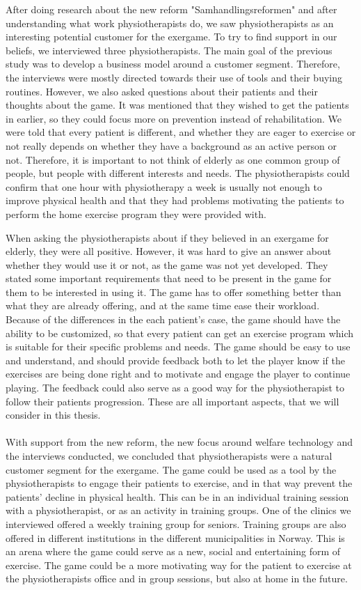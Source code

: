 After doing research about the new reform "Samhandlingsreformen" and after understanding what work physiotherapists do, we saw physiotherapists as an interesting potential customer for the exergame. To try to find support in our beliefs, we interviewed three physiotherapists. The main goal of the previous study was to develop a business model around a customer segment. Therefore, the interviews were mostly directed towards their use of tools and their buying routines. However, we also asked questions about their patients and their thoughts about the game. It was mentioned that they wished to get the patients in earlier, so they could focus more on prevention instead of rehabilitation. We were told that every patient is different, and whether they are eager to exercise or not really depends on whether they have a background as an active person or not. Therefore, it is important to not think of elderly as one common group of people, but people with different interests and needs. The physiotherapists could confirm that one hour with physiotherapy a week is usually not enough to improve physical health and that they had problems motivating the patients to perform the home exercise program they were provided with. 

When asking the physiotherapists about if they believed in an exergame for elderly, they were all positive. However, it was hard to give an answer about whether they would use it or not, as the game was not yet developed. They stated some important requirements that need to be present in the game for them to be interested in using it. The game has to offer something better than what they are already offering, and at the same time ease their workload. Because of the differences in the each patient's case, the game should have the ability to be customized, so that every patient can get an exercise program which is suitable for their specific problems and needs. The game should be easy to use and understand, and should provide feedback both to let the player know if the exercises are being done right and to motivate and engage the player to continue playing. The feedback could also serve as a good way for the physiotherapist to follow their patients progression. These are all important aspects, that we will consider in this thesis. \\ \\
With support from the new reform, the new focus around welfare technology and the interviews conducted, we concluded that physiotherapists were a natural customer segment for the exergame. The game could be used as a tool by the physiotherapists to engage their patients to exercise, and in that way prevent the patients' decline in physical health. This can be in an individual training session with a physiotherapist, or as an activity in training groups. One of the clinics we interviewed offered a weekly training group for seniors. Training groups are also offered in different institutions in the different municipalities in Norway. This is an arena where the game could serve as a new, social and entertaining form of exercise. The game could be a more motivating way for the patient to exercise at the physiotherapists office and in group sessions, but also at home in the future. 

